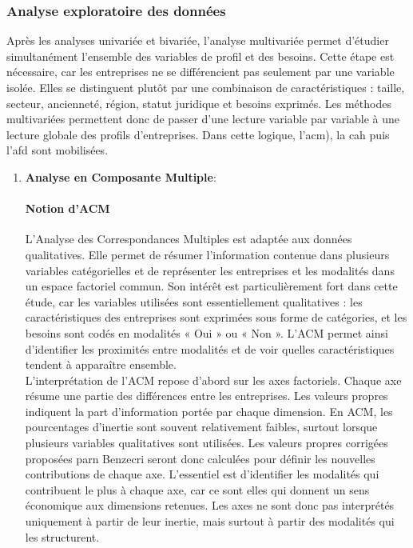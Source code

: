 \documentclass[12pt, a4paper, oneside]{report}
\begin{document}
	\subsubsection{Analyse exploratoire des données}
	Après les analyses univariée et bivariée, l’analyse multivariée permet d’étudier simultanément l’ensemble des variables de profil et des besoins. Cette étape est nécessaire, car les entreprises ne se différencient pas seulement par une variable isolée. Elles se distinguent plutôt par une combinaison de caractéristiques : taille, secteur, ancienneté, région, statut juridique et besoins exprimés. Les méthodes multivariées permettent donc de passer d’une lecture variable par variable à une lecture globale des profils d’entreprises. Dans cette logique, l’\gls{acm}), la \gls{cah} puis l'\gls{afd} sont mobilisées.
	\begin{enumerate}
		\item \textbf{Analyse en Composante Multiple}:
		
		\paragraph{Notion d'ACM}
	L’Analyse des Correspondances Multiples est adaptée aux données qualitatives. Elle permet de résumer l’information contenue dans plusieurs variables catégorielles et de représenter les entreprises et les modalités dans un espace factoriel commun. Son intérêt est particulièrement fort dans cette étude, car les variables utilisées sont essentiellement qualitatives : les caractéristiques des entreprises sont exprimées sous forme de catégories, et les besoins sont codés en modalités « Oui » ou « Non ». L’ACM permet ainsi d’identifier les proximités entre modalités et de voir quelles caractéristiques tendent à apparaître ensemble.\\
	
	L’interprétation de l’ACM repose d’abord sur les axes factoriels. Chaque axe résume une partie des différences entre les entreprises. Les valeurs propres indiquent la part d’information portée par chaque dimension. En ACM, les pourcentages d’inertie sont souvent relativement faibles, surtout lorsque plusieurs variables qualitatives sont utilisées. Les valeurs propres corrigées proposées parn Benzecri seront donc calculées pour définir les nouvelles contributions de chaque axe. L’essentiel est d’identifier les modalités qui contribuent le plus à chaque axe, car ce sont elles qui donnent un sens économique aux dimensions retenues. Les axes ne sont donc pas interprétés uniquement à partir de leur inertie, mais surtout à partir des modalités qui les structurent.\\
	

\end{enumerate}
\end{document}
